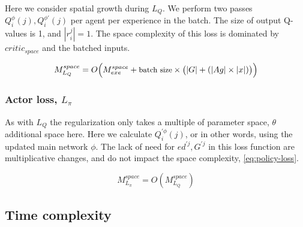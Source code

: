 \documentclass[letterpaper]{article} %
\begin{document}
Here we consider spatial growth during $L_Q$. We perform two passes $Q_i^\phi(j), Q_i^{\phi'}(j)$ per agent per experience in the batch. The size of output Q-values is 1, and $|r^j_i|=1$. The space complexity of this loss is dominated by $critic_{space}$ and the batched inputs. 

\begin{equation}
\small
\label{eq:critic-loss}
    M^{space}_{L_Q} = O\Big( M^{space}_{exe} + \text{batch size} \times \big( |G|+ (|Ag|\times |x|)\big)\Big)
\end{equation}


 

\subsubsection{Actor loss, $L_{\pi}$}

As with $L_Q$ the regularization only takes a multiple of parameter space, $\theta$ additional space here. Here we calculate $Q_i^{'\phi}(j)$, or in other words, using the updated main network $\phi$. The lack of need for $ed^{'j},G^{'j}$ in this loss function are multiplicative changes, and do not impact the space complexity, \ref{eq:policy-loss}.

\begin{equation}
\label{eq:policy-loss}
M^{space}_{L_\pi} = O(M^{space}_{L_Q})
\end{equation}


\subsection{Time complexity}



\end{document}
